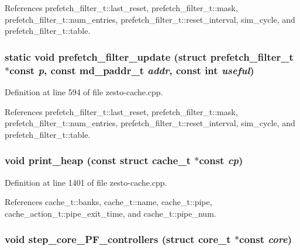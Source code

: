 References prefetch\_\-filter\_\-t::last\_\-reset, prefetch\_\-filter\_\-t::mask, prefetch\_\-filter\_\-t::num\_\-entries, prefetch\_\-filter\_\-t::reset\_\-interval, sim\_\-cycle, and prefetch\_\-filter\_\-t::table.
\subsubsection[{prefetch\_\-filter\_\-update}]{\setlength{\rightskip}{0pt plus 5cm}static void prefetch\_\-filter\_\-update (struct {\bf prefetch\_\-filter\_\-t} $\ast$const  {\em p}, \/  const {\bf md\_\-paddr\_\-t} {\em addr}, \/  const int {\em useful})\hspace{0.3cm}{\tt  [static]}}\label{zesto-cache_8cpp_7867a082122e5a85b7e880d3bfb243f9}




Definition at line 594 of file zesto-cache.cpp.

References prefetch\_\-filter\_\-t::last\_\-reset, prefetch\_\-filter\_\-t::mask, prefetch\_\-filter\_\-t::num\_\-entries, prefetch\_\-filter\_\-t::reset\_\-interval, sim\_\-cycle, and prefetch\_\-filter\_\-t::table.
\subsubsection[{print\_\-heap}]{\setlength{\rightskip}{0pt plus 5cm}void print\_\-heap (const struct {\bf cache\_\-t} $\ast$const  {\em cp})}\label{zesto-cache_8cpp_85af5d6eb3231dd22e161c347a5fd72b}




Definition at line 1401 of file zesto-cache.cpp.

References cache\_\-t::banks, cache\_\-t::name, cache\_\-t::pipe, cache\_\-action\_\-t::pipe\_\-exit\_\-time, and cache\_\-t::pipe\_\-num.
\subsubsection[{step\_\-core\_\-PF\_\-controllers}]{\setlength{\rightskip}{0pt plus 5cm}void step\_\-core\_\-PF\_\-controllers (struct {\bf core\_\-t} $\ast$const  {\em core})}\label{zesto-cache_8cpp_66309167ab5b4ca25ad2bfbf94b0126b}




